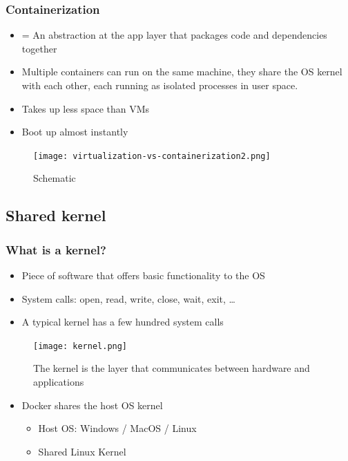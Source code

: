 \documentclass{article}
\begin{document}
\subsubsection{Containerization}

\begin{itemize}
    \item = An abstraction at the app layer that packages code and dependencies together
    \item Multiple containers can run on the same machine, they share the OS kernel with each other, each running as isolated processes in user space.
    \item Takes up less space than VMs
    \item Boot up almost instantly
\end{itemize}

\begin{figure}[H]
    \centering
    \texttt{[image: virtualization-vs-containerization2.png]}
    \caption{Schematic }
\end{figure}

\subsection{Shared kernel}

\subsubsection{What is a kernel?}

\begin{itemize}
    \item Piece of software that offers basic functionality to the OS
    \item System calls: open, read, write, close, wait, exit, \dots
    \item A typical kernel has a few hundred system calls
\end{itemize}

\begin{figure}[H]
    \centering
    \texttt{[image: kernel.png]}
    \caption{The kernel is the layer that communicates between hardware and applications}
\end{figure}


\begin{itemize}
    \item Docker shares the host OS kernel
    \begin{itemize}
        \item Host OS: Windows / MacOS / Linux
        \item Shared Linux Kernel
    \end{itemize}
\end{itemize}
\end{document}
